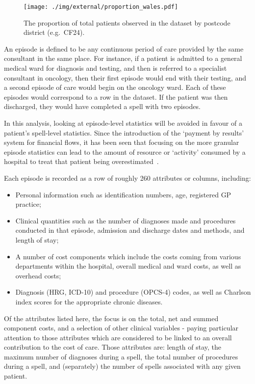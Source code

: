 \begin{figure}[htbp]
    \centering
    \texttt{[image: ./img/external/proportion\_wales.pdf]}
    \caption{The proportion of total patients observed in the dataset by
    postcode district (e.g.\ CF24).}\label{fig:proportion_wales}
\end{figure}

An episode is defined to be any continuous period of care provided
by the same consultant in the same place. For instance, if a patient is admitted
to a general medical ward for diagnosis and testing, and then is referred to a
specialist consultant in oncology, then their first episode would end with their
testing, and a second episode of care would begin on the oncology ward. Each of
these episodes would correspond to a row in the dataset. If the patient was then
discharged, they would have completed a spell with two episodes.

In this analysis, looking at episode-level statistics will be avoided in favour
of a patient's spell-level statistics. Since the introduction of the `payment by
results' system for financial flows, it has been seen that focusing on the more
granular episode statistics can lead to the amount of resource or `activity'
consumed by a hospital to treat that patient being overestimated~\cite{BMJ2004}.

Each episode is recorded as a row of roughly 260 attributes or columns,
including:

\begin{itemize}
    \item Personal information such as identification numbers, age, registered
        GP practice;
    \item Clinical quantities such as the number of diagnoses made and
        procedures conducted in that episode, admission and discharge dates and
        methods, and length of stay;
    \item A number of cost components which include the costs coming from
        various departments within the hospital, overall medical and ward costs,
        as well as overhead costs;
    \item Diagnosis (HRG, ICD-10) and procedure (OPCS-4) codes, as well as
        Charlson index scores for the appropriate chronic diseases.
\end{itemize}

Of the attributes listed here, the focus is on the total, net and summed
component costs, and a selection of other clinical variables \-- paying
particular attention to those attributes which are considered to be linked to an
overall contribution to the cost of care. Those attributes are: length of stay,
the maximum number of diagnoses during a spell, the total number of procedures
during a spell, and (separately) the number of spells associated with any given
patient.

